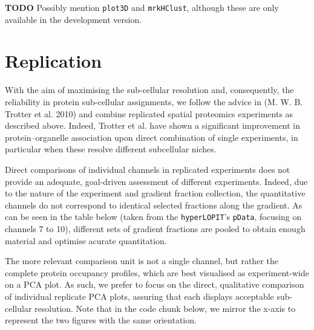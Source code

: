 \textbf{TODO} Possibly mention \texttt{plot3D} and \texttt{mrkHClust},
although these are only available in the development version.

\section{Replication}\label{replication}

With the aim of maximising the sub-cellular resolution and,
consequently, the reliability in protein sub-cellular assignments, we
follow the advice in (M. W. B. Trotter et al. 2010) and combine
replicated spatial proteomics experiments as described above. Indeed,
Trotter et al. have shown a significant improvement in
protein--organelle association upon direct combination of single
experiments, in particular when these resolve different subcellular
niches.

Direct comparisons of individual channels in replicated experiments does
not provide an adequate, goal-driven assessment of different
experiments. Indeed, due to the nature of the experiment and gradient
fraction collection, the quantitative channels do not correspond to
identical selected fractions along the gradient. As can be seen in the
table below (taken from the \texttt{hyperLOPIT}'s \texttt{pData},
focusing on channels 7 to 10), different sets of gradient fractions are
pooled to obtain enough material and optimise acurate quantitation.

The more relevant comparison unit is not a single channel, but rather
the complete protein occupancy profiles, which are best visualised as
experiment-wide on a PCA plot. As such, we prefer to focus on the
direct, qualitative comparison of individual replicate PCA plots,
assuring that each displays acceptable sub-cellular resolution. Note
that in the code chunk below, we mirror the x-axis to represent the two
figures with the same orientation.

\begin{Shaded}
\begin{Highlighting}[]
\NormalTok{(} \NormalTok{(}\NormalTok{, }\NormalTok{)) }
\NormalTok{(hl[, hl$Replicate ==}\StringTok{ }\NormalTok{], } \NormalTok{) }
\NormalTok{(hl[, hl$Replicate ==}\StringTok{ }\NormalTok{], } \NormalTok{, } \NormalTok{) }
\end{Highlighting}
\end{Shaded}

